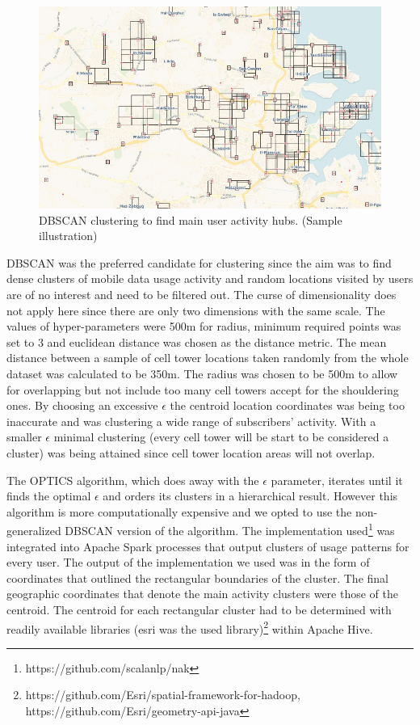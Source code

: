 \documentclass[12pt, a4paper]{report}
\theoremstyle{definition}
\theoremstyle{definition}%
\theoremstyle{definition}%
\theoremstyle{definition}%
\theoremstyle{definition}%
\theoremstyle{definition}%
\begin{document}
\begin{figure}[!]	
	\includegraphics[scale=0.60]{clustering.jpg}
	\centering
	\caption[DBSCAN clustering]{DBSCAN clustering to find main user activity hubs. (Sample illustration)}
	\label{fig:db_scan_clustering}
\end{figure}
 

DBSCAN was the preferred candidate for clustering since the aim was to find dense clusters of mobile data usage activity and random locations visited by users are of no interest and need to be filtered out. The curse of dimensionality does not apply here since there are only two dimensions with the same scale.  The values of hyper-parameters were 500m for radius, minimum required points was set to 3 and euclidean distance was chosen as the distance metric. The mean distance between a sample of cell tower locations taken randomly from the whole dataset was calculated to be 350m. The radius was chosen to be 500m to allow for overlapping but not include too many cell towers accept for the shouldering ones. By choosing an excessive $\epsilon$ the centroid location coordinates was being too inaccurate and was clustering a wide range of subscribers' activity. With a smaller $\epsilon$ minimal clustering (every cell tower will be start to be considered a cluster) was being attained since cell tower location areas will not overlap. 

The OPTICS algorithm, which does away with the $\epsilon$ parameter, iterates until it finds the optimal $\epsilon$ and orders its clusters in a hierarchical result. However this algorithm is more computationally expensive and we opted to use the non-generalized DBSCAN version of the algorithm. The implementation used\footnote{https://github.com/scalanlp/nak} was integrated into Apache Spark processes that output clusters of usage patterns for every user. The output of the implementation we used was in the form of coordinates that outlined the rectangular boundaries of the cluster. The final geographic coordinates that denote the main activity clusters were those of the centroid. The centroid for each rectangular cluster had to be determined with readily available libraries (esri was the used library)\footnote{https://github.com/Esri/spatial-framework-for-hadoop, https://github.com/Esri/geometry-api-java} within Apache Hive. 
\end{document}
